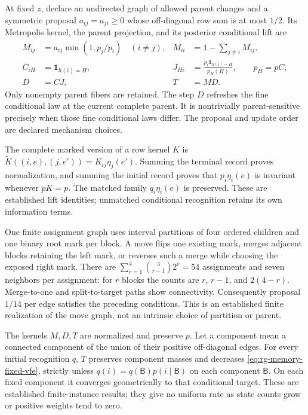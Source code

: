 At fixed \(z\), declare an undirected graph of allowed parent changes and
a symmetric proposal \(a_{ij}=a_{ji}\geq0\) whose off-diagonal row sum
is at most \(1/2\). Its Metropolis kernel, the parent projection, and its
posterior conditional lift are
\begin{equation}
\begin{aligned}
 M_{ij}&=a_{ij}\min(1,p_j/p_i)\quad(i\ne j),
 &M_{ii}&=1-\sum_{j\ne i}M_{ij},\\
 C_{iH}&=\mathbf1_{h(i)=H},
 &J_{Hi}&=\frac{p_i\mathbf1_{h(i)=H}}{p_H(H)},
 \qquad p_H=pC,\\
 D&=CJ,&T&=MD.
\end{aligned}
\label{eq:rg-memory-sweep}
\end{equation}
Only nonempty parent fibers are retained. The step \(D\) refreshes the
fine conditional law at the current complete parent. It is nontrivially
parent-sensitive precisely when those fine conditional laws differ. The
proposal and update order are declared mechanism choices.

The complete marked version of a row kernel \(K\) is
\(\widetilde K((i,e),(j,e'))=K_{ij}\eta_j(e')\). Summing the terminal
record proves normalization, and summing the initial record proves that
\(p_i\eta_i(e)\) is invariant whenever \(pK=p\). The matched family
\(q_i\eta_i(e)\) is preserved. These are established lift identities;
unmatched conditional recognition retains its own information terms.

One finite assignment graph uses interval partitions of four ordered children
and one binary root mark per block. A move flips one existing mark, merges
adjacent blocks retaining the left mark, or reverses such a merge while
choosing the exposed right mark. There are
\(\sum_{r=1}^4\binom3{r-1}2^r=54\) assignments and seven neighbors per
assignment: for \(r\) blocks the counts are \(r\), \(r-1\), and
\(2(4-r)\). Merge-to-one and split-to-target paths show connectivity.
Consequently proposal \(1/14\) per edge satisfies the preceding conditions.
This is an established finite realization of the move graph, not an intrinsic
choice of partition or parent. 

The kernels \(M,D,T\) are normalized and preserve \(p\). Let a component
mean a connected component of the union of their positive off-diagonal
edges. For every initial recognition \(q\), \(T\) preserves component
masses and decreases \cref{eq:rg-memory-fixed-vfe}, strictly unless
\(q(i)=q(\mathsf B)p(i\mid\mathsf B)\) on each component \(\mathsf B\).
On each fixed component it converges geometrically to that conditional target.
These are established finite-instance results; they give no uniform rate as
state counts grow or positive weights tend to zero.

